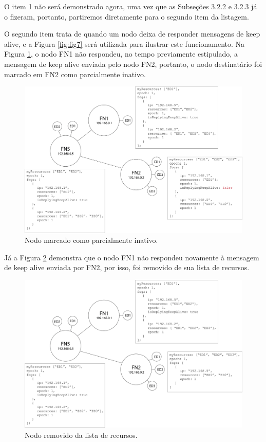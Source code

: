 O item 1 não será demonstrado agora, uma vez que as Subseções 3.2.2 e 3.2.3 já o fizeram, portanto, partiremos diretamente para o segundo item da listagem.

O segundo item trata de quando um nodo deixa de responder mensagens de keep alive, e a Figura \ref{fig:fig7} será utilizada para ilustrar este funcionamento.
Na Figura \ref{fig:fig8}, o nodo FN1 não respondeu, no tempo previamente estipulado, a mensagem de keep alive enviada pelo nodo FN2, 
portanto, o nodo destinatário foi marcado em FN2 como parcialmente inativo.


\begin{figure}[H]
    \centering\includegraphics[width=.8\textwidth]{fig8.png}
    \caption%
    {\label{fig:fig8} Nodo marcado como parcialmente inativo.}
\end{figure}

Já a Figura \ref{fig:fig9} demonstra que o nodo FN1 não respondeu novamente à mensagem de keep alive enviada por FN2, por isso, foi removido de sua lista de recursos. 

\begin{figure}[h!]
    \centering\includegraphics[width=.8\textwidth]{fig9.png}
    \caption%
    {\label{fig:fig9} Nodo removido da lista de recursos.}
\end{figure}

